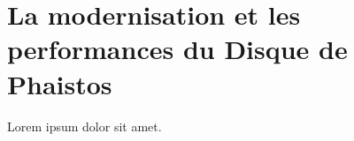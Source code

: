 \section{La modernisation et les performances du Disque de Phaistos}
\label{contrib}

Lorem ipsum dolor sit amet.